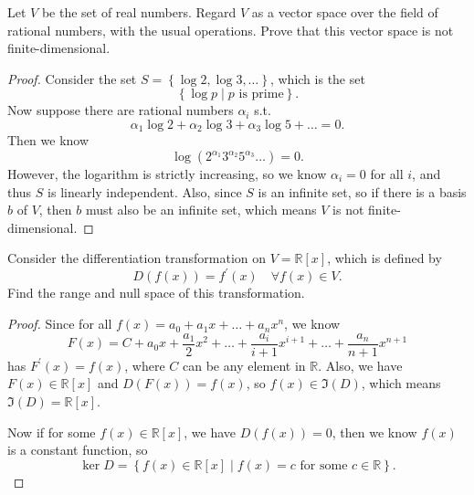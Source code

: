 \begin{problem}
Let \(V\) be the set of real numbers. Regard \(V\) as a vector space over the field of rational numbers, with the usual operations. Prove that this vector space is not finite-dimensional.
\end{problem}
\begin{proof}
    Consider the set \(S = \left\{ \log 2, \log 3, \dots  \right\} \), which is the set 
    \[
        \left\{ \log p \mid p \text{ is prime} \right\}. 
    \] Now suppose there are rational numbers \(\alpha _i\) s.t. 
    \[
        \alpha _1 \log 2 + \alpha _2 \log 3 +\alpha _3 \log 5 + \dots = 0.
    \] Then we know 
    \[
        \log \left( 2^{\alpha _1} 3^{\alpha _2} 5^{\alpha _3} \dots \right) = 0.
    \]
    However, the logarithm is strictly increasing, so we know \(\alpha _i = 0\) for all \(i\), and thus \(S\) is linearly independent. Also, since \(S\) is an infinite set, so if there is a basis \(b\) of \(V\), then \(b\) must also be an infinite set, which means \(V\) is not finite-dimensional.      
\end{proof}

\begin{problem}
Consider the differentiation transformation on \(V=\mathbb{R}[x]\), which is defined by 
\[
  D(f(x)) = f^{\prime} (x) \quad \forall f(x) \in V.  
\] 
Find the range and null space of this transformation.
\end{problem}
\begin{proof}
    Since for all \(f(x) = a_0 + a_1 x + \dots + a_n x^n\), we know 
    \[
        F(x) = C + a_0 x + \frac{a_1}{2} x^2 + \dots + \frac{a_i}{i+1}x^{i+1} + \dots + \frac{a_n}{n+1}x^{n+1}
    \] has \(F^{\prime} (x) = f(x)\), where \(C\) can be any element in \(\mathbb{R} \). Also, we have \(F(x) \in \mathbb{R} [x]\) and \(D(F(x))=f(x)\), so \(f(x) \in \Im (D)\), which means \(\Im (D) = \mathbb{R} [x]\).
    
    Now if for some \(f(x) \in \mathbb{R} [x]\), we have \(D(f(x)) = 0\), then we know \(f(x)\) is a constant function, so
    \[
        \ker D = \left\{ f(x) \in \mathbb{R} [x] \mid f(x) = c \text{ for some } c \in \mathbb{R}  \right\}.
    \]   
\end{proof}

